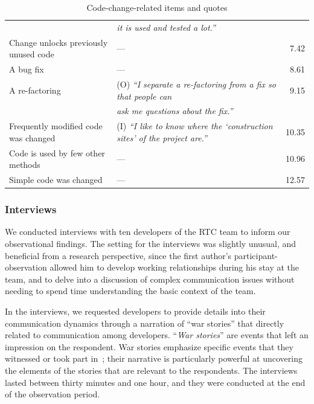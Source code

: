 \begin{table}
\begin{tabular}{l@{\hspace{-10pt}}l@{\hspace{-20pt}}r}
&\emph{it is used and tested a lot.''}&\\
Change unlocks previously unused code &--- & 7.42\\%
A bug fix &--- & 8.61\\%
A re-factoring &(O) \emph{``I separate a re-factoring from a fix so that people can }& 9.15\\%
&\emph{ask me questions about the fix.''}&\\
Frequently modified code was changed &(I) \emph{``I like to know where the `construction sites' of the project are.''}& 10.35\\%
Code is used by few other methods &--- & 10.96\\%
Simple code was changed\phantom{abcdefgheabcdefghe} &--- & 12.57\\%
\bottomrule
\end{tabular}
\caption{Code-change-related items and quotes}
\label{tab:sub-technical}
\label{tab:surveyfactors}
\end{table}

\subsubsection{Interviews}
We conducted interviews with ten developers of the RTC team to inform our observational findings. The setting for the interviews was slightly unusual, and beneficial from a research perspective, since the first author's participant-observation allowed him to develop working relationships during his stay at the team, and to delve into a discussion of complex communication issues without needing to spend time understanding the basic context of the team.

In the interviews, we requested developers to provide details into their communication dynamics through a narration of ``war stories'' that directly related to communication among developers. ``\emph{War stories}'' are events that left an impression on the respondent. War stories emphasize specific events that they witnessed or took part in~\cite{lutters:ist:2007}; their narrative is particularly powerful at uncovering the elements of the stories that are relevant to the respondents. The interviews lasted between thirty minutes and one hour, and they were conducted at the end of the observation period. 


